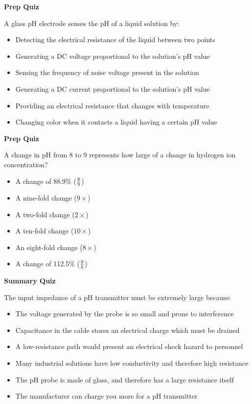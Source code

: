\vfil \eject

\noindent
{\bf Prep Quiz}

A glass pH electrode senses the pH of a liquid solution by:

\begin{itemize}
\item{} Detecting the electrical resistance of the liquid between two points
\vskip 5pt
\item{} Generating a DC voltage proportional to the solution's pH value
\vskip 5pt
\item{} Sensing the frequency of noise voltage present in the solution
\vskip 5pt
\item{} Generating a DC current proportional to the solution's pH value
\vskip 5pt
\item{} Providing an electrical resistance that changes with temperature
\vskip 5pt
\item{} Changing color when it contacts a liquid having a certain pH value
\end{itemize}



\vfil \eject

\noindent
{\bf Prep Quiz}

A change in pH from 8 to 9 represents how large of a change in hydrogen ion concentration?

\begin{itemize}
\item{} A change of 88.9\% ($8 \over 9$)
\vskip 5pt
\item{} A nine-fold change ($9 \times$)
\vskip 5pt
\item{} A two-fold change ($2 \times$)
\vskip 5pt
\item{} A ten-fold change ($10 \times$)
\vskip 5pt
\item{} An eight-fold change ($8 \times$)
\vskip 5pt
\item{} A change of 112.5\% ($9 \over 8$) 
\end{itemize}




\vfil \eject

\noindent
{\bf Summary Quiz}

The input impedance of a pH transmitter must be extremely large because:

\begin{itemize}
\item{} The voltage generated by the probe is so small and prone to interference
\vskip 5pt
\item{} Capacitance in the cable stores an electrical charge which must be drained
\vskip 5pt
\item{} A low-resistance path would present an electrical shock hazard to personnel
\vskip 5pt
\item{} Many industrial solutions have low conductivity and therefore high resistance
\vskip 5pt
\item{} The pH probe is made of glass, and therefore has a large resistance itself
\vskip 5pt
\item{} The manufacturer can charge you more for a pH transmitter
\end{itemize}





